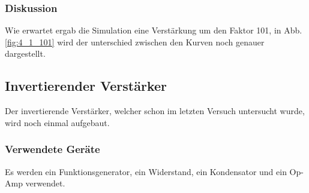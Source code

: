 \documentclass[12pt,a4paper]{article}
\begin{document}
\subsubsection{Diskussion}

Wie erwartet ergab die Simulation eine Verstärkung um den Faktor 101, in Abb. \ref{fig:4_1_101} wird der unterschied zwischen den Kurven noch genauer dargestellt.





\subsection{Invertierender Verstärker}
Der invertierende Verstärker, welcher schon im letzten Versuch untersucht wurde, wird noch einmal aufgebaut.
\subsubsection{Verwendete Geräte}

Es werden ein Funktionsgenerator, ein Widerstand, ein Kondensator und ein Op-Amp verwendet.
\end{document}
